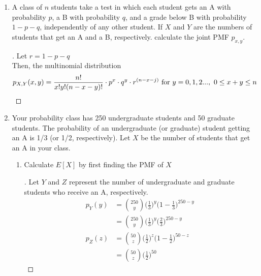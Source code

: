 \documentclass[paper=usletter, fontsize=12pt]{article}
\begin{document}
\begin{enumerate}[label=\textbf{\arabic*}.]
        \item
        A class of $n$ students take a test in which each student gets an A
        with probability $p$, a B with probability $q$, and a grade below B
        with probability $1 - p - q$, independently of any other student. If
        $X$ and $Y$ are the numbers of students that get an A and a B,
        respectively. calculate the joint PMF $p_{x,y}$.
        \begin{proof}[\unskip\nopunct]
            Let $r = 1 - p - q$\\
            Then, the multinomial distribution
            \begin{align*}
            p_{X,Y}(x, y) & = \frac{n!}{x!y!(n-x-y)!} \cdot p^x \cdot q^y \cdot r^{(n-x-j)} \text{ for } y=0,1,2..., \ 0 \le x+y \le n \qedhere
            \end{align*}
        \end{proof}
        \vspace{0.2in}

        \item
        Your probability class has 250 undergraduate students and 50 graduate
        students. The probability of an undergraduate (or graduate) student
        getting an A is 1/3 (or 1/2, respectively). Let $X$ be the number of
        students that get an A in your class.
        \begin{enumerate}[label=(\alph*)]

            \item Calculate $E[X]$ by first finding the PMF of $X$
            \begin{proof}[\unskip\nopunct]
                Let $Y$ and $Z$ represent the number of undergraduate and
                graduate students who receive an A, respectively.
                \begingroup
                \addtolength{\jot}{1em}
                \begin{align*}
                    p_Y(y) & = \binom{250}{y}\bigg( \frac{1}{3} \bigg)^y\bigg( 1 - \frac{1}{3} \bigg)^{250-y}\\
                    & = \binom{250}{y}\bigg( \frac{1}{3} \bigg)^y\bigg( \frac{2}{3} \bigg)^{250-y} \\
                    p_Z(z) & = \binom{50}{z}\bigg( \frac{1}{2} \bigg)^z\bigg( 1 - \frac{1}{2} \bigg)^{50-z}\\
                    & = \binom{50}{z}\bigg( \frac{1}{2} \bigg)^{50}
                \end{align*}
                \endgroup
            \end{proof}
            \vspace{0.2in}


\end{enumerate}
\end{enumerate}
\end{document}
